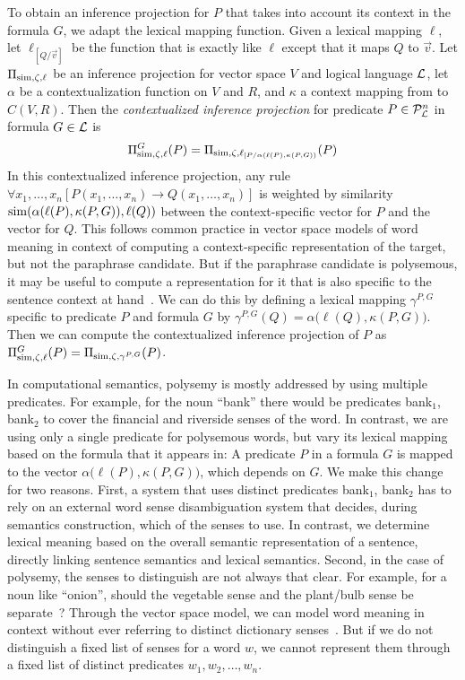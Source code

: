 To obtain an inference projection for $P$ that takes into account its context in
the formula $G$, we adapt the lexical mapping function. Given a lexical mapping
$\ell$, let $\ell_{[Q/\vec{v}]}$ be the function that is exactly like $\ell$
except that it maps $Q$ to $\vec v$. Let $\Pi_{\mathrm{sim}, \zeta, \ell}$ be an
inference projection for vector space $V$ and logical language ${\cal{L}}$, let
$\alpha$ be a contextualization function on $V$ and $R$, and $\kappa$ a context
mapping from \loglang to $C(V, R)$. Then the \textit{contextualized inference
projection} for predicate $P \in {\cal{P}}_{{\cal{L}}}^n$ in formula $G \in
{\cal{L}}$ is \[ \Pi^G_{\mathrm{sim}, \zeta, \ell}(P) = \Pi_{\mathrm{sim}, \zeta,
  \ell_{[P/\alpha(\ell(P), \kappa(P, G))}}(P)
\] In this contextualized inference projection, any rule $\forall x_1,\ldots,x_n [P(
x_1,\ldots,x_n) \to Q(x_1,\ldots,x_n)]$ is weighted by similarity $\mathrm{sim}(\alpha(\ell(P), \kappa(P,
G)), \ell(Q))$ between the context-specific vector for $P$ and the vector for
$Q$. This follows common practice in vector space models of word meaning in
context of computing a context-specific representation of the target, but not
the paraphrase candidate. But if the paraphrase candidate is polysemous, it may
be useful to compute a representation for it that is also specific to the
sentence context at hand~\citep{erk:acl2010}.  We can do this by defining a
lexical mapping $\gamma^{P, G}$ specific to predicate $P$ and formula $G$ by
$\gamma^{P, G}(Q) = \alpha\big(\ell(Q), \kappa(P, G)\big)$. Then we can compute
the contextualized inference projection of $P$ as $\Pi^G_{\mathrm{sim}, \zeta,
\ell}(P) = \Pi_{\mathrm{sim}, \zeta, \gamma^{P, G}}(P)$.

In computational semantics, polysemy is mostly addressed by using multiple
predicates. For example, for the noun ``bank'' there would be predicates
bank$_1$, bank$_2$ to cover the financial and riverside senses of the word. In
contrast, we are using only a single predicate for polysemous words, but vary
its lexical mapping based on the formula that it appears in: A predicate $P$ in
a formula $G$ is mapped to the vector $\alpha\big(\ell(P), \kappa(P, G)\big)$,
which depends on $G$. We make this change for two reasons. First, a system that
uses distinct predicates bank$_1$, bank$_2$ has to rely on an external word
sense disambiguation system that decides, during semantics construction, which
of the senses to use. In contrast, we determine lexical meaning based on the
overall semantic representation of a sentence, directly linking sentence
semantics and lexical semantics. Second, in the case of polysemy, the senses to
distinguish are not always that clear. For example, for a noun like ``onion'',
should the vegetable sense and the plant/bulb sense be
separate~\citep{krishnamurthy:chj2000}? Through the vector space model, we
can model word meaning in context without ever referring to distinct dictionary
senses~\citep{erk:gems2010}. But if we do not distinguish a fixed list of senses
for a word $w$, we cannot represent them through a fixed list of distinct predicates
$w_1, w_2, \ldots, w_n$.
